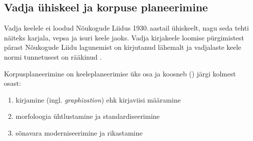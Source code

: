 \documentclass[12pt,a4paper]{article}
\begin{document}





\subsection{Vadja ühiskeel ja korpuse planeerimine}
\label{korpuse-planeerimine}


Vadja keelele ei loodud Nõukogude Liidus 1930.\,aastail ühiskeelt, nagu seda tehti näiteks karjala, vepsa ja isuri keele jaoks. Vadja kirjakeele loomise pürgimistest pärast Nõukogude Liidu lagunemist on kirjutanud lähemalt \cite{ernits_vadja_2006} ja vadjalaste keele normi tunnetusest on rääkinud \cite{markus_concept_2013}.

Korpusplaneerimine on keele\-planeerimise üks osa ja koosneb (\cite{kloss_research_1970}) järgi kolmest osast:
\begin{enumerate}
\item kirjamine (ingl. \textit{graphization}) ehk kirjaviisi määramine
\item morfoloogia ühtlustamine ja standardiseerimine
\item sõnavara moderniseerimine ja rikastamine
\end{enumerate}
\end{document}
